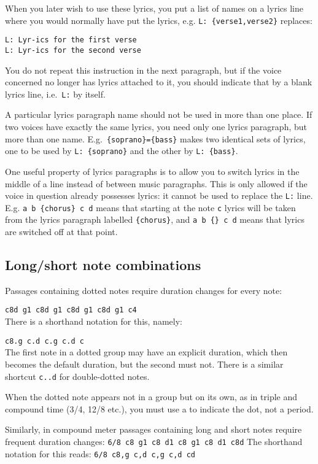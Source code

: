 \documentclass[11pt]{article}
\begin{document}
When you later wish to use these lyrics, you put a list of names on a lyrics
line where you would normally have put the lyrics, e.g. 
\verb'L: {verse1,verse2}' replaces:
\begin{verbatim}
L: Lyr-ics for the first verse
L: Lyr-ics for the second verse
\end{verbatim}
You do not repeat this instruction in the next paragraph, but if the voice 
concerned no longer has lyrics attached to it, you should indicate that by a 
blank lyrics line, i.e.~\verb'L:' by itself. 

A particular lyrics paragraph name should not be used in more than one 
place.  If two voices have exactly the same lyrics, you need only one lyrics 
paragraph, but more than one name.  E.g.~\verb'{soprano}={bass}' makes two 
identical sets of lyrics, one to be used by \verb'L: {soprano}' and the 
other by \verb'L: {bass}'. 

One useful property of lyrics paragraphs is to allow you to
switch lyrics in the middle of a line instead of between music paragraphs.
This is only allowed if the voice in question already possesses lyrics:
it cannot be used to replace the \texttt{L:} line.  E.g.  
 \verb"a b {chorus} c d"  
means that starting at the note \texttt{c} lyrics will be taken
from the lyrics paragraph labelled \verb"{chorus}", and 
 \verb"a b {} c d" 
means that lyrics are switched off at that point.

\subsection{Long/short note combinations} \label{longshort}

Passages containing dotted notes 
require duration changes for every note:

\verb"c8d g1 c8d g1 c8d g1 c8d g1 c4"  \\
There is a shorthand notation for this, namely:

\verb"c8.g c.d c.g c.d c" \\
The first note in a dotted group may have an explicit duration, which then 
becomes the default duration, but the second must not.  There is a similar
shortcut \verb"c..d" for double-dotted notes.

When the dotted note appears not in a group but on its own, as in triple and 
compound time (3/4, 12/8 etc.), you must use a  to indicate the 
dot, not a period. 

Similarly, in compound meter passages containing long and short notes
require frequent duration changes:
\verb"6/8 c8 g1 c8 d1 c8 g1 c8 d1 c8d"  
The shorthand notation for this reads:
\verb"6/8 c8,g c,d c,g c,d cd" 
\end{document}
